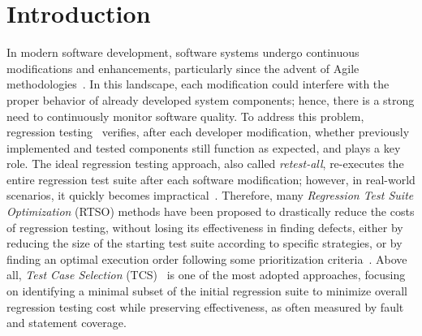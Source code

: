 \section{Introduction}
\label{intro}
In modern software development, software systems undergo continuous modifications and enhancements, particularly since the advent of Agile methodologies~\citep {annosi2024agile,meier2023agile}. In this landscape, each modification could interfere with the proper behavior of already developed system components; hence, there is a strong need to continuously monitor software quality. To address this problem, regression testing~\citep{yoo2012regression} verifies, after each developer modification, whether previously implemented and tested components still function as expected, and plays a key role. The ideal regression testing approach, also called \textit{retest-all}, re-executes the entire regression test suite after each software modification; however, in real-world scenarios, it quickly becomes impractical~\citep{rothermel1998empirical,perrouin2012pairwise}. Therefore, many \textit{Regression Test Suite Optimization} (RTSO) methods have been proposed to drastically reduce the costs of regression testing, without losing its effectiveness in finding defects, either by reducing the size of the starting test suite according to specific strategies, or by finding an optimal execution order following some prioritization criteria~\citep{yoo2007pareto,yoo2010using,yoo2011highly,wang2013minimizing,panichella2014improving,arrieta2019pareto,xue2020multi}. Above all, \textit{Test Case Selection} (TCS)~\citep{engstrom2010systematic,yoo2012regression} is one of the most adopted approaches, focusing on identifying a minimal subset of the initial regression suite to minimize overall regression testing cost while preserving effectiveness, as often measured by fault and statement coverage.

